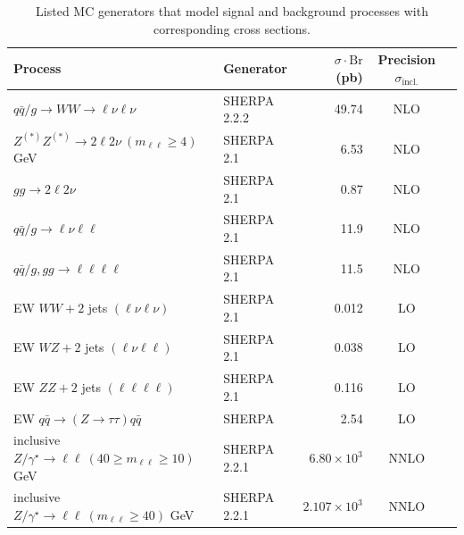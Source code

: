 \begin{table}[h]
  \centering
  \caption{Listed MC generators that model signal and background processes with corresponding cross sections.}
{\footnotesize
  \begin{tabular}{llrcc}
    \hline\hline
    Process & Generator & \hspace*{-3mm}$\sigma\cdot\mathrm{Br}$ (pb) & Precision $\sigma_{\mathrm{incl.}}$\\
\hline 
    \hline 
    \hline
    $q\bar{q}/g\rightarrow WW \rightarrow \ell\nu\ell\nu$              & \textsc{SHERPA} 2.2.2 & 49.74  & NLO\\ 
    $Z^{(\ast)}Z^{(\ast)} \to 2\ell2\nu~(m_{\ell\ell} \ge 4 )$GeV   & \textsc{SHERPA}  2.1  & 6.53   & NLO\\

    $gg \to  2\ell2\nu$                     & \textsc{SHERPA}  2.1 & 0.87 & NLO\\

    $q\bar{q}/g \to  \ell\nu\ell\ell$       & \textsc{SHERPA} 2.1 & 11.9 & NLO\\

    $q\bar{q}/g, gg \to  \ell\ell\ell\ell$  & \textsc{SHERPA} 2.1 & 11.5 & NLO\\


    EW $WW + 2$ jets $(\ell\nu\ell\nu)$   & \textsc{SHERPA} 2.1 & 0.012 & LO \\
    EW $WZ + 2$ jets $(\ell\nu\ell\ell)$  & \textsc{SHERPA} 2.1 & 0.038 & LO \\
    EW $ZZ + 2$ jets $(\ell\ell\ell\ell)$ & \textsc{SHERPA} 2.1 & 0.116 & LO \\
    EW $q\bar{q} {\to}(Z\rightarrow\tau\tau) q\bar{q}$ & \textsc{SHERPA} & 2.54 & LO\\
    \hline
     inclusive $Z/\gamma^{\star} \to \ell\ell~(40 \ge m_{\ell\ell} \ge 10)$GeV & \textsc{SHERPA} 2.2.1 & $6.80 \times 10^{3}$ & NNLO\\ %
    inclusive $Z/\gamma^{\star} \to \ell\ell~( m_{\ell\ell} \ge 40)$ GeV       & \textsc{SHERPA} 2.2.1 & $2.107 \times 10^{3}$ & NNLO\\


\end{tabular}}
\end{table}
